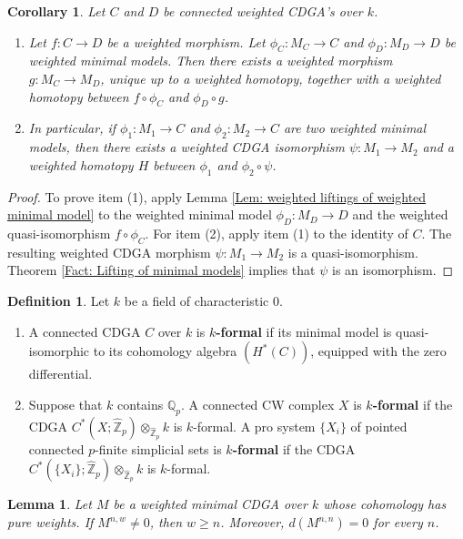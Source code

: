 \documentclass[11pt]{amsart}
\newtheorem{lemma}[theorem]{Lemma}
\newtheorem{corollary}[theorem]{Corollary}
\theoremstyle{definition}
\newtheorem{definition}[theorem]{Definition}
\numberwithin{equation}{section}
\numberwithin{equation}{section}
\newcommand\QQ{\mathbb{Q}}
\newcommand\ZZ{\mathbb{Z}}
\begin{document}
\begin{corollary}
Let $C$ and $D$ be connected weighted CDGA's over $k$. 
\begin{enumerate}[leftmargin=0.25in]
    \item Let $f:C\rightarrow D$ be a weighted morphism. Let $\phi_C:M_C\rightarrow C$ and $\phi_D:M_D\rightarrow D$ be weighted minimal models. Then  there exists a weighted morphism $g:M_C\rightarrow M_D$, unique up to a weighted homotopy, together with a weighted homotopy between $f\circ \phi_C$ and $\phi_D\circ g$.
    \item In particular, if $\phi_1:M_1\rightarrow C$ and $\phi_2:M_2\rightarrow C$ are two weighted minimal models, then there exists a weighted CDGA isomorphism $\psi:M_1\rightarrow M_2$ and a weighted homotopy $H$ between $\phi_1$ and $\phi_2\circ \psi$.   
\end{enumerate}
\end{corollary}

\begin{proof}
To prove item (1), apply Lemma \ref{Lem: weighted liftings of weighted minimal model} to the weighted minimal model $\phi_D:M_D\rightarrow D$ and the weighted quasi-isomorphism $f\circ \phi_C$. For item (2), apply item (1) to the identity of $C$. The resulting weighted CDGA morphism $\psi:M_1\rightarrow M_2$ is a quasi-isomorphism. Theorem \ref{Fact: Lifting of minimal models} implies that $\psi$ is an isomorphism.
\end{proof}

\begin{definition}
Let $k$ be a field of characteristic $0$.
\begin{enumerate}[leftmargin=0.25in]
    \item A connected CDGA $C$ over $k$ is \textbf{$k$-formal} if its minimal model is quasi-isomorphic to its cohomology algebra $(H^*(C))$, equipped with the zero differential.
    \item Suppose that $k$ contains $\QQ_{p}$. A connected CW complex $X$ is \textbf{$k$-formal} if the CDGA $C^*(X;\widehat{\ZZ}_{p})\otimes_{\widehat{\ZZ}_{p}}k$ is $k$-formal. A pro system $\{X_i\}$ of pointed connected $p$-finite simplicial sets is \textbf{$k$-formal} if the CDGA $C^*(\{X_i\};\widehat{\ZZ}_{p})\otimes_{\widehat{\ZZ}_{p}}k$ is $k$-formal.
\end{enumerate}
\end{definition}

\begin{lemma}\label{Lem: weight and cohomological degree in a weighted minimal CDGA}
Let $M$ be a weighted minimal CDGA over $k$ whose cohomology has pure weights. If $M^{n,w}\neq 0$, then $w\geq n$. Moreover, $d(M^{n,n})=0$ for every $n$.
\end{lemma}
\end{document}
